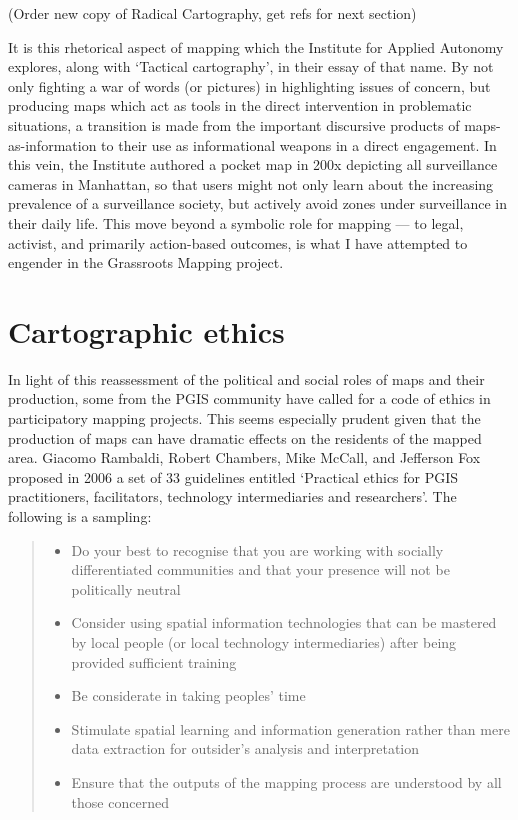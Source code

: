 \documentclass[11pt,oneside,notitlepage]{report}
\begin{document}

(Order new copy of Radical Cartography, get refs for next section)

It is this rhetorical aspect of mapping which the Institute for Applied Autonomy explores, along with `Tactical cartography', in their essay of that name. By not only fighting a war of words (or pictures) in highlighting issues of concern, but producing maps which act as tools in the direct intervention in problematic situations, a transition is made from the important discursive products of maps-as-information to their use as informational weapons in a direct engagement. In this vein, the Institute authored a pocket map in 200x depicting all surveillance cameras in Manhattan, so that users might not only learn about the increasing prevalence of a surveillance society, but actively avoid zones under surveillance in their daily life. This move beyond a symbolic role for mapping --- to legal, activist, and primarily action-based outcomes, is what I have attempted to engender in the Grassroots Mapping project.

\section{Cartographic ethics}
\label{sec:ethics}

In light of this reassessment of the political and social roles of maps and their production, some from the PGIS community have called for a code of ethics in participatory mapping projects. This seems especially prudent given that the production of maps can have dramatic effects on the residents of the mapped area. Giacomo Rambaldi, Robert Chambers, Mike McCall, and Jefferson Fox proposed in 2006 a set of 33 guidelines entitled `Practical ethics for PGIS practitioners, facilitators, technology intermediaries and researchers'. The following is a sampling:

\begin{quote}\begin{itemize}
\item Do your best to recognise that you are working with socially differentiated communities and that your presence will not be politically neutral
\item Consider using spatial information technologies that can be mastered by local people (or local technology intermediaries) after being provided sufficient training
\item Be considerate in taking peoples' time
\item Stimulate spatial learning and information generation rather than mere data extraction for outsider’s analysis and interpretation
\item Ensure that the outputs of the mapping process are understood by all those concerned
\end{itemize}
\cite{rambaldi2006practical}
\end{quote}
\end{document}

